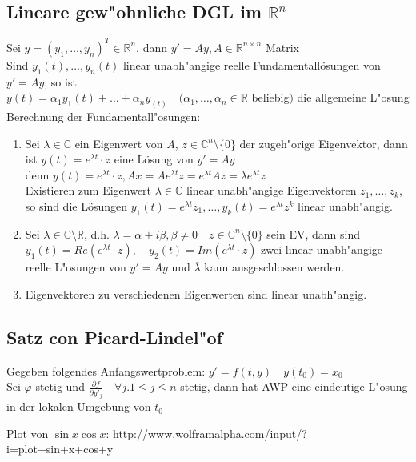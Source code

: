 \documentclass[10pt,a4paper^, twocolumn]{article}
\newcommand{\menge}{\mathbb} %
\renewcommand{\phi}{\varphi} %
\begin{document}
\subsection{Lineare gew"ohnliche DGL im $\menge{R}^n$}
Sei $y = (y_1,\dots,y_n)^T \in \menge{R}^n$, dann $y' = Ay, A \in \menge{R}^{n\times n}$ Matrix \\
Sind $y_1(t),\dots,y_n(t)$ linear unabh"angige reelle Fundamentallösungen von $y' = Ay$,
so ist \\
$y(t) = \alpha_1 y_1(t)+\dots+\alpha_ny_(t) \quad (\alpha_1,\dots,\alpha_n \in \menge{R}$ beliebig$)$ die allgemeine L"osung\\
Berechnung der Fundamentall"osungen:
\begin{enumerate}
\item{} Sei $\lambda \in \menge{C}$ ein Eigenwert von $A$, $z \in \menge{C}^n \setminus \{0\}$ der zugeh"orige Eigenvektor,
dann ist $y(t) = e^{\lambda t} \cdot z$ eine Lösung von $y' = Ay$  \\
denn $y(t) = e^{\lambda t} \cdot z, Ax = Ae^{\lambda t}z = e^{\lambda t}Az = \lambda e^{\lambda t}z$ \\
Existieren zum Eigenwert $\lambda \in \menge{C}$ linear unabh"angige Eigenvektoren $z_1,\dots,z_k$, so sind die Lösungen
$y_1(t) = e^{\lambda t}z_1, \dots, y_k(t) = e^{\lambda t}z^k$ linear unabh"angig.
\item{} Sei $\lambda \in \menge{C} \setminus \menge{R}$, d.h. $\lambda = \alpha + i\beta, \beta \neq 0 \quad z \in \menge{C}^n \setminus \{0\}$ sein EV,
dann sind $y_1(t) = Re(e^{\lambda t} \cdot z), \quad y_2(t) = Im(e^{\lambda t} \cdot z)$ zwei linear unabh"angige reelle L"osungen von $y' = Ay$ 
und $\overline\lambda$ kann ausgeschlossen werden.
\item{} Eigenvektoren zu verschiedenen Eigenwerten sind linear unabh"angig.
\end{enumerate}

\subsection{Satz con Picard-Lindel"of}
Gegeben folgendes Anfangswertproblem: $y' = f(t,y) \quad y(t_0) = x_0$ \\
Sei $\phi$ stetig und $\frac{\partial f}{\partial y'_j} \quad \forall j.1 \leq j \leq n$ stetig, dann hat AWP eine eindeutige L"osung in der lokalen Umgebung von $t_0$


Plot von $\sin x \cos x$: http://www.wolframalpha.com/input/?i=plot+sin+x+cos+y





%
%
%
%
%
%
%
%
\end{document}
